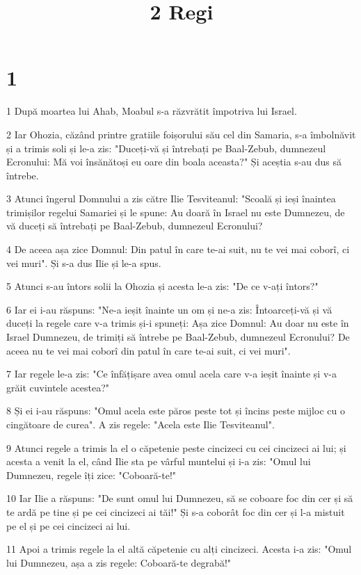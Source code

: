

\title{2 Regi}


\chapter{1}

\par 1 După moartea lui Ahab, Moabul s-a răzvrătit împotriva lui Israel.
\par 2 Iar Ohozia, căzând printre gratiile foișorului său cel din Samaria, s-a îmbolnăvit și a trimis soli și le-a zis: "Duceți-vă și întrebați pe Baal-Zebub, dumnezeul Ecronului: Mă voi însănătoși eu oare din boala aceasta?" Și aceștia s-au dus să întrebe.
\par 3 Atunci îngerul Domnului a zis către Ilie Tesviteanul: "Scoală și ieși înaintea trimișilor regelui Samariei și le spune: Au doară în Israel nu este Dumnezeu, de vă duceți să întrebați pe Baal-Zebub, dumnezeul Ecronului?
\par 4 De aceea așa zice Domnul: Din patul în care te-ai suit, nu te vei mai coborî, ci vei muri". Și s-a dus Ilie și le-a spus.
\par 5 Atunci s-au întors solii la Ohozia și acesta le-a zis: "De ce v-ați întors?"
\par 6 Iar ei i-au răspuns: "Ne-a ieșit înainte un om și ne-a zis: Întoarceți-vă și vă duceți la regele care v-a trimis și-i spuneți: Așa zice Domnul: Au doar nu este în Israel Dumnezeu, de trimiți să întrebe pe Baal-Zebub, dumnezeul Ecronului? De aceea nu te vei mai coborî din patul în care te-ai suit, ci vei muri".
\par 7 Iar regele le-a zis: "Ce înfățișare avea omul acela care v-a ieșit înainte și v-a grăit cuvintele acestea?"
\par 8 Și ei i-au răspuns: "Omul acela este păros peste tot și încins peste mijloc cu o cingătoare de curea". A zis regele: "Acela este Ilie Tesviteanul".
\par 9 Atunci regele a trimis la el o căpetenie peste cincizeci cu cei cincizeci ai lui; și acesta a venit la el, când Ilie sta pe vârful muntelui și i-a zis: "Omul lui Dumnezeu, regele îți zice: "Coboară-te!"
\par 10 Iar Ilie a răspuns: "De sunt omul lui Dumnezeu, să se coboare foc din cer și să te ardă pe tine și pe cei cincizeci ai tăi!" Și s-a coborât foc din cer și l-a mistuit pe el și pe cei cincizeci ai lui.
\par 11 Apoi a trimis regele la el altă căpetenie cu alți cincizeci. Acesta i-a zis: "Omul lui Dumnezeu, așa a zis regele: Coboară-te degrabă!"
